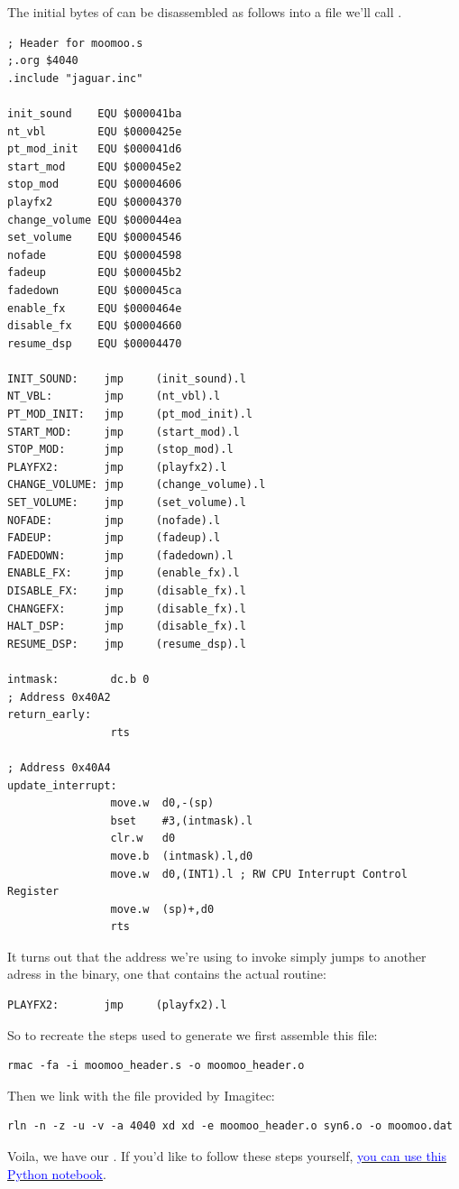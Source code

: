 The initial bytes of  can be disassembled as follows into a file we'll call . 
\begin{lstlisting}[caption=The contents of \icode{moomoo\_header.s}.]
; Header for moomoo.s
;.org $4040
.include "jaguar.inc"

init_sound    EQU $000041ba
nt_vbl        EQU $0000425e
pt_mod_init   EQU $000041d6
start_mod     EQU $000045e2
stop_mod      EQU $00004606
playfx2       EQU $00004370
change_volume EQU $000044ea
set_volume    EQU $00004546
nofade        EQU $00004598
fadeup        EQU $000045b2
fadedown      EQU $000045ca
enable_fx     EQU $0000464e
disable_fx    EQU $00004660
resume_dsp    EQU $00004470

INIT_SOUND:    jmp     (init_sound).l
NT_VBL:        jmp     (nt_vbl).l
PT_MOD_INIT:   jmp     (pt_mod_init).l
START_MOD:     jmp     (start_mod).l
STOP_MOD:      jmp     (stop_mod).l
PLAYFX2:       jmp     (playfx2).l
CHANGE_VOLUME: jmp     (change_volume).l
SET_VOLUME:    jmp     (set_volume).l
NOFADE:        jmp     (nofade).l
FADEUP:        jmp     (fadeup).l
FADEDOWN:      jmp     (fadedown).l
ENABLE_FX:     jmp     (enable_fx).l
DISABLE_FX:    jmp     (disable_fx).l
CHANGEFX:      jmp     (disable_fx).l
HALT_DSP:      jmp     (disable_fx).l
RESUME_DSP:    jmp     (resume_dsp).l

intmask:        dc.b 0
; Address 0x40A2
return_early:
                rts

; Address 0x40A4
update_interrupt:
                move.w  d0,-(sp)
                bset    #3,(intmask).l
                clr.w   d0
                move.b  (intmask).l,d0
                move.w  d0,(INT1).l ; RW CPU Interrupt Control Register
                move.w  (sp)+,d0
                rts
\end{lstlisting}

It turns out that the address we're using to invoke  simply jumps to another adress in the binary,
one that contains the actual  routine:

\begin{lstlisting}
PLAYFX2:       jmp     (playfx2).l
\end{lstlisting}

So to recreate the steps used to generate  we first assemble this file:

\begin{lstlisting}
rmac -fa -i moomoo_header.s -o moomoo_header.o
\end{lstlisting}

Then we link  with the  file provided by Imagitec:
\begin{lstlisting}
rln -n -z -u -v -a 4040 xd xd -e moomoo_header.o syn6.o -o moomoo.dat
\end{lstlisting}

Voila, we have our . If you'd like to follow these steps yourself, \href{https://github.com/mwenge/t2k-25easypieces/blob/master/notebooks/Recreate%20moo.dat/Recreate%20moomoo.dat%20using%20syn6.o.ipynb}{\textcolor{blue}{you can use this Python notebook}}.

